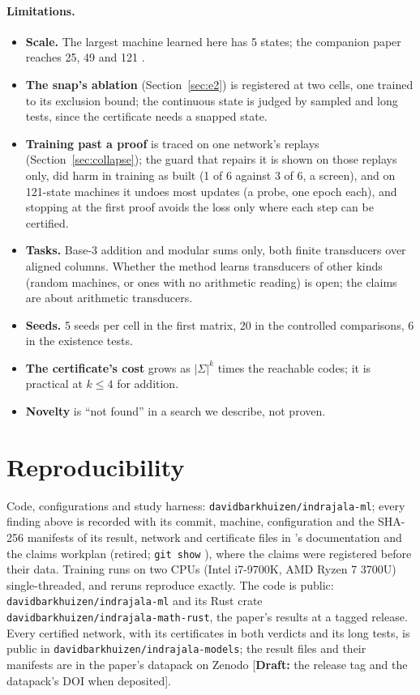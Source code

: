\documentclass[11pt]{article}
\newcommand{\draftnote}[1]{\textcolor{red!70!black}{[\textbf{Draft:} #1]}}
\begin{document}
\paragraph{Limitations.}
\begin{itemize}
\item \textbf{Scale.} The largest machine learned here has 5 states; the companion paper reaches 25,
  49 and 121 \citep{barkhuizen-2026-certified-modular-division}.
\item \textbf{The snap's ablation} (Section~\ref{sec:e2}) is registered at two cells, one trained
  to its exclusion bound; the continuous state is judged by sampled and long tests, since the
  certificate needs a snapped state.
\item \textbf{Training past a proof} is traced on one network's replays
  (Section~\ref{sec:collapse}); the guard that repairs it is shown on those replays only, did harm
  in training as built (1 of 6 against 3 of 6, a screen), and on 121-state machines it undoes most
  updates (a probe, one epoch each), and
  stopping at the first proof avoids the loss only where each step can be certified.
\item \textbf{Tasks.} Base-3 addition and modular sums only, both finite transducers over aligned
  columns. Whether the method learns transducers of other kinds (random machines, or ones with no
  arithmetic reading) is open; the claims are about arithmetic transducers.
\item \textbf{Seeds.} 5 seeds per cell in the first matrix, 20 in the controlled comparisons, 6 in
  the existence tests.
\item \textbf{The certificate's cost} grows as $|\Sigma|^k$ times the reachable codes; it is
  practical at $k \le 4$ for addition.
\item \textbf{Novelty} is ``not found'' in a search we describe, not proven.
\end{itemize}

\section{Reproducibility}

Code, configurations and study harness: \texttt{davidbarkhuizen/indrajala-ml}; every finding above
is recorded with its commit, machine, configuration and the SHA-256 manifests of its result, network
and certificate files in 's documentation and
the claims workplan (retired; \texttt{git show} ), where the claims were registered before their
data. Training runs on two CPUs (Intel i7-9700K, AMD Ryzen 7 3700U) single-threaded, and reruns
reproduce exactly. The code is public: \texttt{davidbarkhuizen/indrajala-ml} and its Rust crate
\texttt{davidbarkhuizen/indrajala-math-rust}, the paper's results at a tagged release. Every
certified network, with its certificates in both verdicts and its long tests, is public in
\texttt{davidbarkhuizen/indrajala-models}; the result files and their manifests are in the paper's
datapack on Zenodo \draftnote{the release tag and the datapack's DOI when deposited}.
\end{document}
